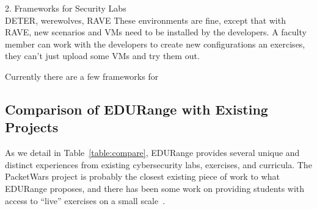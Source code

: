 2. Frameworks for Security Labs \\
DETER, werewolves, RAVE
These environments are fine, except that with RAVE, new scenarios and VMs need to be installed by
the developers.  A faculty member can work with the developers to create new configurations an exercises,
they can't just upload some VMs and try them out.

Currently there are a few frameworks for 

\subsection{Comparison of EDURange with Existing Projects}

As we detail in Table~\ref{table:compare}, EDURange provides several
unique and distinct experiences from existing cybersecurity labs,
exercises, and curricula.  The PacketWars project is probably the
closest existing piece of work to what EDURange proposes, and there
has been some work on providing students with access to ``live''
exercises on a small scale~\cite{vigna}.


